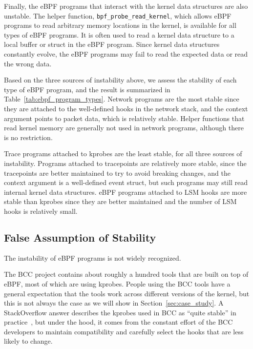 Finally, the eBPF programs that interact with the kernel data structures are also unstable.
The helper function, \texttt{bpf\_probe\_read\_kernel},
which allows eBPF programs to read arbitrary memory locations in the kernel,
is available for all types of eBPF programs.
It is often used to read a kernel data structure to a local buffer or struct in the eBPF program.
Since kernel data structures constantly evolve, the eBPF programs may fail to read the expected data or read the wrong data.



Based on the three sources of instability above, we assess the stability of each type of eBPF program,
and the result is summarized in Table~\ref{tab:ebpf_program_types}.
Network programs are the most stable since they are attached to the well-defined hooks in the network stack,
and the context argument points to packet data, which is relatively stable.
Helper functions that read kernel memory are generally not used in network programs, although there is no restriction.

Trace programs attached to kprobes are the least stable, for all three sources of instability.
Programs attached to tracepoints are relatively more stable, since the tracepoints are better maintained to try to avoid breaking changes,
and the context argument is a well-defined event struct, but such programs may still read internal kernel data structures.
eBPF programs attached to LSM hooks are more stable than kprobes since they are better maintained and the number
of LSM hooks is relatively small.

\subsection{False Assumption of Stability}
The instability of eBPF programs is not widely recognized.

The BCC project contains about roughly a hundred tools that are built on top of eBPF,
 most of which are using kprobes.
People using the BCC tools have a general expectation that the tools work across
different versions of the kernel, but this is not always the case as we will show in Section~\ref{sec:case_study}.
A StackOverflow answer describes the kprobes used in BCC as
``quite stable'' in practice~\cite{bpf-stability-so}, but under the hood,
it comes from the constant effort of the BCC developers
to maintain compatibility and carefully select the hooks that are less likely to change.

